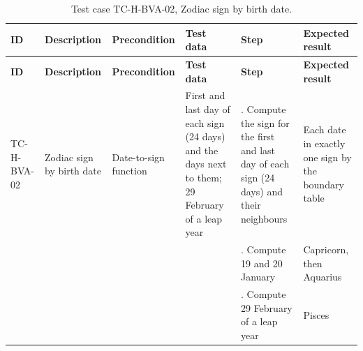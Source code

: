 {\footnotesize{}\renewcommand{\arraystretch}{1.1}
\begin{longtable}{|>{\raggedright\arraybackslash}p{}|>{\raggedright\arraybackslash}p{}|>{\raggedright\arraybackslash}p{}|>{\raggedright\arraybackslash}p{}|>{\raggedright\arraybackslash}p{}|>{\raggedright\arraybackslash}p{}|}
\caption{Test case TC-\allowbreak{}H-\allowbreak{}BVA-\allowbreak{}02, Zodiac sign by birth date.} \\
\hline
\textbf{ID} & \textbf{Description} & \textbf{Precondition} & \textbf{Test data} & \textbf{Step} & \textbf{Expected result} \\ \hline
\endfirsthead
\hline
\textbf{ID} & \textbf{Description} & \textbf{Precondition} & \textbf{Test data} & \textbf{Step} & \textbf{Expected result} \\ \hline
\endhead
TC-H-BVA-02 & Zodiac sign by birth date & Date-\allowbreak{}to-\allowbreak{}sign function & First and last day of each sign (24 days) and the days next to them; 29 February of a leap year & 1. Compute the sign for the first and last day of each sign (24 days) and their neighbours & Each date in exactly one sign by the boundary table \\ \cline{5-6}
 &  &  &  & 2. Compute 19 and 20 January & Capricorn, then Aquarius \\ \cline{5-6}
 &  &  &  & 3. Compute 29 February of a leap year & Pisces \\ \hline
\end{longtable}
}


